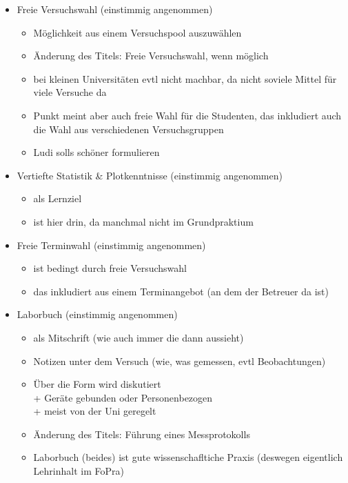 \begin{itemize}
\begin{itemize}
        \end{itemize}
      \item Freie Versuchswahl (einstimmig angenommen)
        \begin{itemize}
          \item Möglichkeit aus einem Versuchspool auszuwählen
          \item Änderung des Titels: Freie Versuchswahl, wenn möglich
          \item bei kleinen Universitäten evtl nicht machbar, da nicht soviele Mittel für viele Versuche da
          \item Punkt meint aber auch freie Wahl für die Studenten, das inkludiert auch die Wahl aus verschiedenen Versuchsgruppen
          \item Ludi solls schöner formulieren
        \end{itemize}
      \item Vertiefte Statistik \& Plotkenntnisse (einstimmig angenommen)
        \begin{itemize}
          \item als Lernziel
          \item ist hier drin, da manchmal nicht im Grundpraktium
        \end{itemize}
      \item Freie Terminwahl (einstimmig angenommen)
        \begin{itemize}
          \item ist bedingt durch freie Versuchswahl
          \item das inkludiert aus einem Terminangebot (an dem der Betreuer da ist)
        \end{itemize}
      \item Laborbuch (einstimmig angenommen)
        \begin{itemize}
          \item als Mitschrift (wie auch immer die dann aussieht)
          \item Notizen unter dem Versuch (wie, was gemessen, evtl Beobachtungen)
          \item Über die Form wird diskutiert \\
              + Geräte gebunden oder Personenbezogen \\
              + meist von der Uni geregelt
          \item Änderung des Titels: Führung eines Messprotokolls
          \item Laborbuch (beides) ist gute wissenschafltiche Praxis (deswegen eigentlich Lehrinhalt im FoPra)

\end{itemize}
\end{itemize}
